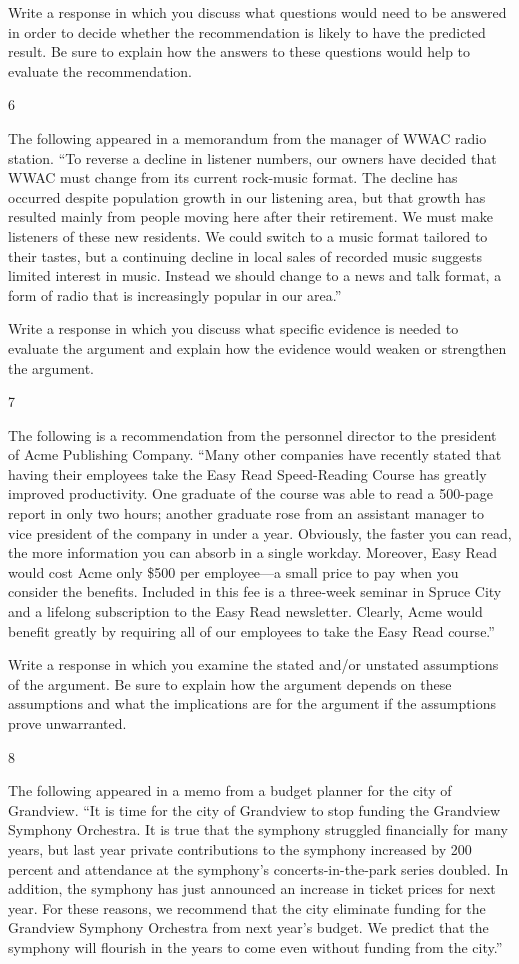 \documentclass[]{article}
\begin{document}
Write a response in which you discuss what questions would need to be
answered in order to decide whether the recommendation is likely to have
the predicted result. Be sure to explain how the answers to these
questions would help to evaluate the recommendation.

6

The following appeared in a memorandum from the manager of WWAC radio
station. ``To reverse a decline in listener numbers, our owners have
decided that WWAC must change from its current rock-music format. The
decline has occurred despite population growth in our listening area,
but that growth has resulted mainly from people moving here after their
retirement. We must make listeners of these new residents. We could
switch to a music format tailored to their tastes, but a continuing
decline in local sales of recorded music suggests limited interest in
music. Instead we should change to a news and talk format, a form of
radio that is increasingly popular in our area.''

Write a response in which you discuss what specific evidence is needed
to evaluate the argument and explain how the evidence would weaken or
strengthen the argument.

7

The following is a recommendation from the personnel director to the
president of Acme Publishing Company. ``Many other companies have
recently stated that having their employees take the Easy Read
Speed-Reading Course has greatly improved productivity. One graduate of
the course was able to read a 500-page report in only two hours; another
graduate rose from an assistant manager to vice president of the company
in under a year. Obviously, the faster you can read, the more
information you can absorb in a single workday. Moreover, Easy Read
would cost Acme only \$500 per employee---a small price to pay when you
consider the benefits. Included in this fee is a three-week seminar in
Spruce City and a lifelong subscription to the Easy Read newsletter.
Clearly, Acme would benefit greatly by requiring all of our employees to
take the Easy Read course.''

Write a response in which you examine the stated and/or unstated
assumptions of the argument. Be sure to explain how the argument depends
on these assumptions and what the implications are for the argument if
the assumptions prove unwarranted.

8

The following appeared in a memo from a budget planner for the city of
Grandview. ``It is time for the city of Grandview to stop funding the
Grandview Symphony Orchestra. It is true that the symphony struggled
financially for many years, but last year private contributions to the
symphony increased by 200 percent and attendance at the symphony's
concerts-in-the-park series doubled. In addition, the symphony has just
announced an increase in ticket prices for next year. For these reasons,
we recommend that the city eliminate funding for the Grandview Symphony
Orchestra from next year's budget. We predict that the symphony will
flourish in the years to come even without funding from the city.''
\end{document}

